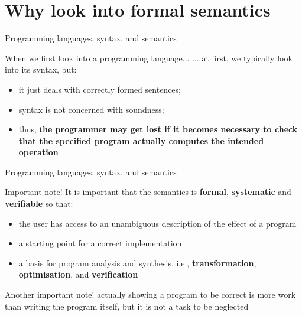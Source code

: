 \documentclass[aspectratio=169]{beamer}
\begin{document}
\frame[plain]{\titlepage}


\section{Why look into formal semantics}

\newcommand{\kw}[1]{\structure{\text{#1}}}

\begin{slide}{Programming languages, syntax, and semantics}
  \begin{block}{When we first look into a programming language...}
  ... at first, we typically look into its syntax, but:
  \begin{itemize}
    \item it just deals with correctly formed sentences;
    \item syntax is not concerned with soundness; 
    \item thus, t\textbf{he programmer may get lost if it becomes necessary to check that the specified
program actually computes the intended operation}
  \end{itemize}
  \end{block}
\end{slide}

\begin{slide}{Programming languages, syntax, and semantics}
  \begin{block}{Important note!}
  It is important that the semantics is \textbf{formal}, \textbf{systematic} and \textbf{verifiable} so that:
  \begin{itemize}
    \item the user has access to an unambiguous description of the effect of a program %
    \item a starting point for a correct implementation %
    \item a basis for program analysis and synthesis, i.e., \textbf{transformation}, \textbf{optimisation}, and \textbf{verification}
  \end{itemize}
  \end{block}
  \begin{block}{Another important note!}
    actually showing a program to be correct is more work than writing the
program itself, but it is not a task to be neglected
  \end{block}
\end{slide}
\end{document}
